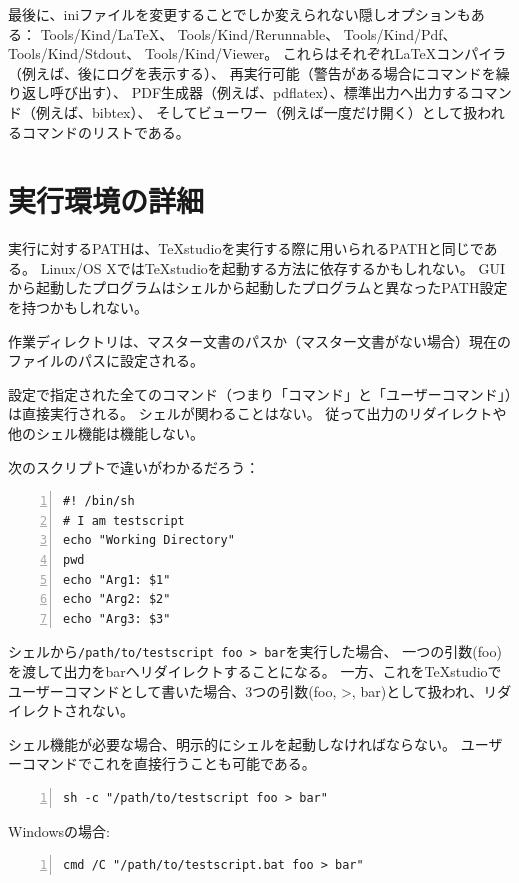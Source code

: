 最後に、iniファイルを変更することでしか変えられない隠しオプションもある：
Tools/Kind/LaTeX、 Tools/Kind/Rerunnable、 Tools/Kind/Pdf、
Tools/Kind/Stdout、 Tools/Kind/Viewer。
これらはそれぞれLaTeXコンパイラ（例えば、後にログを表示する）、
再実行可能（警告がある場合にコマンドを繰り返し呼び出す）、
PDF生成器（例えば、pdflatex）、標準出力へ出力するコマンド（例えば、bibtex）、
そしてビューワー（例えば一度だけ開く）として扱われるコマンドのリストである。

\section{実行環境の詳細}

実行に対するPATHは、TeXstudioを実行する際に用いられるPATHと同じである。
Linux/OS XではTeXstudioを起動する方法に依存するかもしれない。
GUIから起動したプログラムはシェルから起動したプログラムと異なったPATH設定を持つかもしれない。

作業ディレクトリは、マスター文書のパスか（マスター文書がない場合）現在のファイルのパスに設定される。

設定で指定された全てのコマンド（つまり「コマンド」と「ユーザーコマンド」）は直接実行される。
シェルが関わることはない。
従って出力のリダイレクトや他のシェル機能は機能しない。

次のスクリプトで違いがわかるだろう：

\begin{lstlisting}[frame=single,breaklines=true,numbers=left]
#! /bin/sh
# I am testscript
echo "Working Directory"
pwd
echo "Arg1: $1"
echo "Arg2: $2"
echo "Arg3: $3"
\end{lstlisting}

シェルから\verb+/path/to/testscript foo > bar+を実行した場合、
一つの引数(foo)を渡して出力をbarへリダイレクトすることになる。
一方、これをTeXstudioでユーザーコマンドとして書いた場合、3つの引数(foo,
\textgreater{}, bar)として扱われ、リダイレクトされない。

シェル機能が必要な場合、明示的にシェルを起動しなければならない。
ユーザーコマンドでこれを直接行うことも可能である。

\begin{lstlisting}[frame=single,breaklines=true,numbers=left]
sh -c "/path/to/testscript foo > bar"
\end{lstlisting}

Windowsの場合:

\begin{lstlisting}[frame=single,breaklines=true,numbers=left]
cmd /C "/path/to/testscript.bat foo > bar"
\end{lstlisting}

